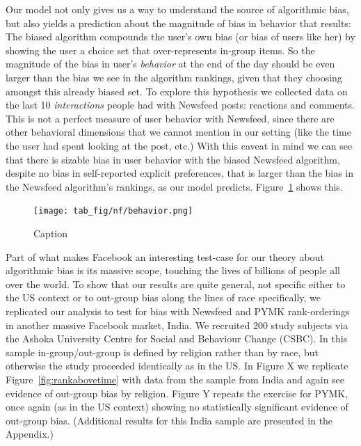 \documentclass[12pt,letterpaper]{article}
\begin{document}
Our model not only gives us a way to understand the source of algorithmic bias, but also yields a prediction about the magnitude of bias in behavior that results: The biased algorithm compounds the user's own bias (or bias of users like her) by showing the user a choice set that over-represents in-group items. So the magnitude of the bias in user's \emph{behavior} at the end of the day should be even larger than the bias we see in the algorithm rankings, given that they choosing amongst this already biased set. To explore this hypothesis we collected data on the last 10 \emph{interactions} people had with Newsfeed posts: reactions and comments. This is not a perfect measure of user behavior with Newsfeed, since there are other behavioral dimensions that we cannot mention in our setting (like the time the user had spent looking at the post, etc.) With this caveat in mind we can see that there is sizable bias in user behavior with the biased Newsfeed algorithm, despite no bias in self-reported explicit preferences, that is larger than the bias in the Newsfeed algorithm's rankings, as our model predicts.  Figure~\ref{fig:behavior} shows this. 
 
\begin{figure}[!h]
    \centering
    \texttt{[image: tab\_fig/nf/behavior.png]}
    \caption{Caption}
    \label{fig:behavior}
\end{figure}

Part of what makes Facebook an interesting test-case for our theory about algorithmic bias is its massive scope, touching the lives of billions of people all over the world. To show that our results are quite general, not specific either to the US context or to out-group bias along the lines of race specifically, we replicated our analysis to test for bias with Newsfeed and PYMK rank-orderings in another massive Facebook market, India. We recruited 200 study subjects via the Ashoka University Centre for Social and Behaviour Change (CSBC). In this sample in-group/out-group is defined by religion rather than by race, but otherwise the study proceeded identically as in the US. In Figure X we replicate Figure~\ref{fig:rankabovetime} with data from the sample from India and again see evidence of out-group bias by religion. Figure Y repeats the exercise for PYMK, once again (as in the US context) showing no statistically significant evidence of out-group bias. (Additional results for this India sample are presented in the Appendix.)

\end{document}
